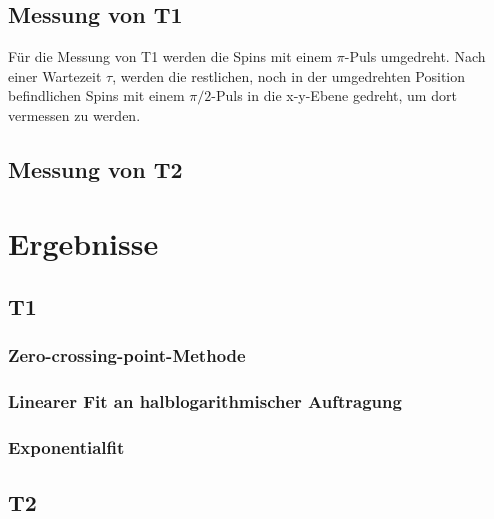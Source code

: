 \documentclass[12pt,a4paper]{article}
\begin{document}
\subsection{Messung von T1}
Für die Messung von T1 werden die Spins mit einem $\pi$-Puls umgedreht. Nach einer Wartezeit $\tau$, werden die restlichen, noch in der umgedrehten Position befindlichen Spins mit einem $\pi /2$-Puls in die x-y-Ebene gedreht, um dort vermessen zu werden.



\subsection{Messung von T2}


\section{Ergebnisse}

\subsection{T1}
\subsubsection{Zero-crossing-point-Methode}
\subsubsection{Linearer Fit an halblogarithmischer Auftragung}
\subsubsection{Exponentialfit}



\subsection{T2}
\end{document}
